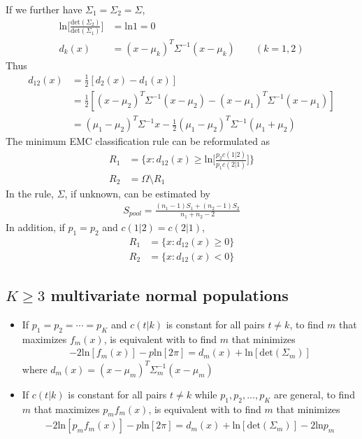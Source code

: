 \documentclass[12pt]{extarticle}
\newcommand{\<}{\langle}
\renewcommand{\>}{\rangle}
\theoremstyle{definition}
\begin{document}
\newpage
If we further have $\Sigma_1 =\Sigma_2 =\Sigma$,
\begin{align*}
    \text{ln}\bigg[\frac{\text{det}(\Sigma_2)}{\text{det}(\Sigma_1)}\bigg] &= \text{ln}1 = 0\\
    d_k(x) &= (x-\mu_k)^T \Sigma^{-1} (x-\mu_k) \qquad (k=1,2)
\end{align*}
Thus
\begin{align*}
    d_{12}(x) &= \frac{1}{2}[d_2(x) -d_1(x)]\\
    &= \frac{1}{2}[(x-\mu_2)^T \Sigma^{-1} (x-\mu_2) -(x-\mu_1)^T \Sigma^{-1} (x-\mu_1)]\\
    &= (\mu_1 -\mu_2)^T \Sigma^{-1} x -\frac{1}{2} (\mu_1 -\mu_2)^T \Sigma^{-1} (\mu_1 +\mu_2)
\end{align*}
The minimum EMC classification rule can be reformulated as
\begin{align*}
    R_1 &= \Bigg\{x:d_{12}(x) \geq \text{ln}\bigg[\frac{p_2 c(1|2)}{p_1 c(2|1)}\bigg] \Bigg\} \\
    R_2 &= \Omega \setminus R_1
\end{align*}
In the rule, $\Sigma$, if unknown, can be estimated by
\begin{align*}
    S_{pool} =\frac{(n_1 -1)S_1 +(n_2 -1)S_2}{n_1 +n_2 -2}
\end{align*}
In addition, if $p_1 =p_2$ and $c(1|2)=c(2|1)$,
\begin{align*}
    R_1 &= \{x:d_{12}(x) \geq 0 \} \\
    R_2 &= \{x:d_{12}(x) < 0 \}
\end{align*}

\subsection{$K \geq 3$ multivariate normal populations}
\begin{itemize}
    \item If $p_1 =p_2 =\cdots =p_K$ and $c(t|k)$ is constant for all pairs $t \neq k$, to find $m$ that maximizes $f_m(x)$, is equivalent with to find $m$ that minimizes
    \begin{align*}
        -2\text{ln}[f_m(x)] -p\text{ln}[2\pi] = d_m(x) +\text{ln}[\text{det}(\Sigma_m)]
    \end{align*}
    where $d_m(x)=(x-\mu_m)^T \Sigma^{-1}_m (x-\mu_m)$
    \item If $c(t|k)$ is constant for all pairs $t \neq k$ while $p_1,p_2,...,p_K$ are general, to find $m$ that maximizes $p_m f_m (x)$, is equivalent with to find $m$ that minimizes
    \begin{align*}
        -2\text{ln}[p_m f_m(x)] -p\text{ln}[2\pi] = d_m(x) + \text{ln}[\text{det}(\Sigma_m)] -2\text{ln}p_m
    \end{align*}
\end{itemize}
\end{document}
